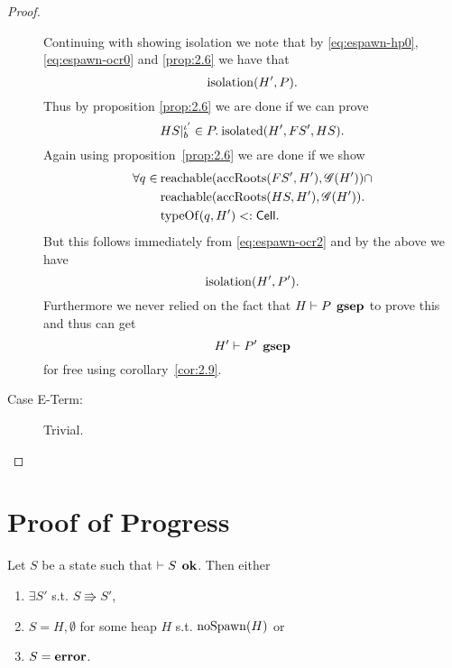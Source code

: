 \begin{proof}
\begin{description}
      Continuing with showing isolation we note that by \eqref{eq:espawn-hp0},
      \eqref{eq:espawn-ocr0} and \ref{prop:2.6} we have that
      \begin{equation}
        \mbox{$\mathrm{isolation}$}(H', P).
      \end{equation}
      Thus by proposition \ref{prop:2.6} we are done if we can prove 
      \begin{equation}
        HS|_b^{\iota'} \in P. \: \mbox{$\mathrm{isolated}$}(H', FS', HS).
      \end{equation}
      Again using proposition~\ref{prop:2.6} we are done if we show
      \begin{equation}
        \begin{aligned}
          \forall q \in \: &\mbox{$\mathrm{reachable}$}(\mbox{$\mathrm{accRoots}$}(FS', H'), \mathscr{G}(H')) \cap \\
            &\mbox{$\mathrm{reachable}$}(\mbox{$\mathrm{accRoots}$}(HS, H'), \mathscr{G}(H')) . \\
            &\mbox{$\mathrm{typeOf}$}(q, H') <: \mbox{$\mathsf{Cell}$}.
        \end{aligned}
      \end{equation}
      But this follows immediately from \eqref{eq:espawn-ocr2} and 
      by the above we have
      \begin{equation}
        \mbox{$\mathrm{isolation}$}(H', P').
      \end{equation} 
      Furthermore we never relied on the fact that $H \vdash P \:\: \mbox{\bf gsep}$ to
      prove this and thus can get
      \begin{equation}
        H' \vdash P' \:\: \mbox{\bf gsep} 
      \end{equation}
      for free using corollary~\ref{cor:2.9}.

    \item[Case {\sc E-Term}:] Trivial.
  \end{description}
\end{proof}


\section{Proof of Progress}
\label{sec:proof_of_progress}

\begin{theorem*}[Progress]
  Let $S$ be a state such that $\vdash S \:\: \mbox{\bf ok}$. Then either 
  \begin{enumerate}
    \item $\exists S'$ s.t. $S \Rrightarrow S'$, 
    \item $S = H, \emptyset$ for some heap $H$ s.t. $\mbox{$\mathrm{noSpawn}$}{(H)}$ or
    \item $S = \mbox{{\bf error}}$.
  \end{enumerate}
\end{theorem*}

